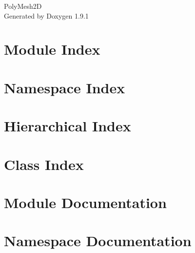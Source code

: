 \let\mypdfximage\pdfximage\def\pdfximage{\immediate\mypdfximage}\documentclass[twoside]{book}
\newcommand{\+}{\discretionary{\mbox{\scriptsize$\hookleftarrow$}}{}{}}
\newcommand{\clearemptydoublepage}{%
  \newpage{\pagestyle{empty}\cleardoublepage}%
}
\begin{document}
\raggedbottom

\hypersetup{pageanchor=false,
             bookmarksnumbered=true,
             pdfencoding=unicode
            }
\begin{titlepage}
\vspace*{7cm}
\begin{center}%
{\Large Poly\+Mesh2D }\\
\vspace*{1cm}
{\large Generated by Doxygen 1.9.1}\\
\end{center}
\end{titlepage}
\clearemptydoublepage
{}
\tableofcontents
\clearemptydoublepage
{}
\hypersetup{pageanchor=true}

\chapter{Module Index}

\chapter{Namespace Index}

\chapter{Hierarchical Index}

\chapter{Class Index}

\chapter{Module Documentation}




\chapter{Namespace Documentation}




\end{document}
